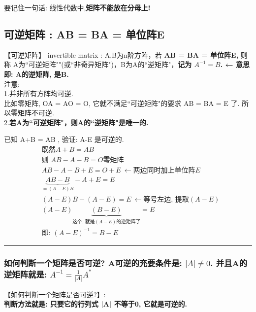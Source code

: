 \documentclass[UTF8]{ctexart}
\begin{document}
要记住一句话: 线性代数中,\textbf{矩阵不能放在分母上!} \\



\subsection{可逆矩阵 : AB = BA = 单位阵E}

【可逆矩阵】 invertible matrix : A,B为n阶方阵，若 \textbf{AB = BA = 单位阵E,} 则称 A为``可逆矩阵""(或``非奇异矩阵")，B为A的``逆矩阵"，\textbf{记为 $A^{-1}=B$. ← 意思即: A的逆矩阵, 是B.} \\ 

注意: \\
1.并非所有方阵均可逆. \\
比如零矩阵, OA = AO = O, 它就不满足``可逆矩阵"的要求 AB = BA = E 了. 所以零矩阵不可逆.\\

2.\textbf{若A为``可逆矩阵"，则A的``逆矩阵"是唯一的.}\\




\begin{myEnvSample}
	已知 A+B = AB , 验证:  A-E 是可逆的. 
	\begin{align*}
	& \text{既然}A+B=AB\\
& \text{则\ }AB-A-B=O\text{零矩阵}\\
& AB-A-B+E=O+E\ ←\text{两边同时加上单位阵}E\\
& \underset{=(A-E)B}{\underbrace{AB-B}}-A+E=E\\
& (A-E)B-\left( A-E \right) =E\ ←\text{等号左边,\ 提取}\left( A-E \right)\\
& \left( A-E \right) \underset{\text{这个,\ 就是}\left( A-E \right) \text{的逆矩阵了}}{\underbrace{\left( B-E \right) }}=E\\
& \text{即:\ }\left( A-E \right) ^{-1}=B-E
\end{align*}
\end{myEnvSample}



\hrule

\subsubsection{如何判断一个矩阵是否可逆? A可逆的充要条件是: $|A| \ne 0$. 并且A的逆矩阵就是: $	A^{-1}=\frac{1}{|A|}A^*	$}



【如何判断一个矩阵是否可逆?】: \\
\textbf{判断方法就是: 只要它的行列式 |A| 不等于0, 它就是可逆的.}\\
\end{document}
